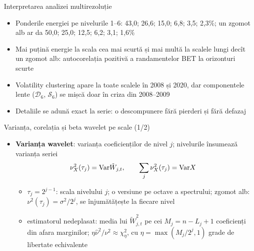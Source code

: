 \begin{frame}{Interpretarea analizei multirezoluție}
\itemsize{\small}
\begin{itemize}
    \item Ponderile energiei pe nivelurile 1--6: 43{,}0; 26{,}6; 15{,}0; 6{,}8; 3{,}5; 2{,}3\%; un zgomot alb ar da 50{,}0; 25{,}0; 12{,}5; 6{,}2; 3{,}1; 1{,}6\%
    \item Mai puțină energie la scala cea mai scurtă și mai multă la scalele lungi decît un zgomot alb: autocorelația pozitivă a randamentelor BET la orizonturi scurte
    \item Volatility clustering apare la toate scalele în 2008 și 2020, dar componentele lente ($\mathcal D_6$, $\mathcal S_6$) se mișcă doar în criza din 2008--2009
    \item Detaliile se adună exact la serie: o descompunere fără pierderi și fără defazaj
\end{itemize}
\end{frame}

\begin{frame}{Varianța, corelația și beta wavelet pe scale (1/2)}
\itemsize{\small}
\begin{itemize}
    \item \textbf{Varianța wavelet}: varianța coeficienților de nivel $j$; nivelurile însumează varianța seriei 
    \[ \nu_X^2(\tau_j) = \text{Var}\tilde W_{j,t}, \qquad \sum_j\nu^2_X(\tau_j) = \text{Var} X \]
    \begin{itemize}
        \item $\tau_j = 2^{j-1}$: scala nivelului $j$; o versiune pe octave a spectrului; zgomot alb: $\nu^2(\tau_j) = \sigma^2/2^j$, se înjumătățește la fiecare nivel
        \item estimatorul nedeplasat: media lui $\tilde W^2_{j,t}$ pe cei $M_j = n - L_j + 1$ coeficienți din afara marginilor; $\eta\hat\nu^2/\nu^2 \approx \chi^2_\eta$, cu $\eta = \max(M_j/2^j, 1)$ grade de libertate echivalente
    \end{itemize}
\end{itemize}
\end{frame}

